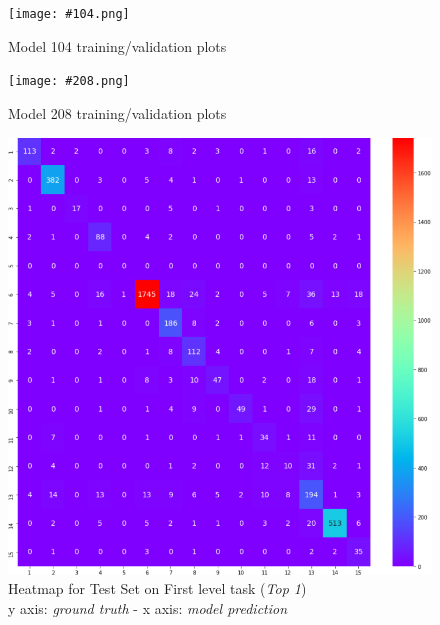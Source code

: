 \documentclass[12pt]{article}
\begin{document}
\pagebreak

\begin{figure}[ht!]
        \begin{adjustwidth}{-3.2cm}{}
    	    \begin{center}
        \texttt{[image: \#104.png]}
            \end{center}
	    \end{adjustwidth}
        \caption{Model 104 training/validation plots}
        \label{fig:model104}
\end{figure}

\begin{figure}[ht!]
        \begin{adjustwidth}{-3.2cm}{}
    	    \begin{center}
        \texttt{[image: \#208.png]}
            \end{center}
	    \end{adjustwidth}
        \caption{Model 208 training/validation plots}
        \label{fig:model200}
\end{figure}
\newpage
{}
\begin{figure}[ht!]
        \begin{adjustwidth}{-3.2cm}{}
    	    \begin{center}
        \includegraphics[width=1.45\textwidth]{heatmap1.png}
            \end{center}
	    \end{adjustwidth}
	    \captionsetup{justification   = centering}
        \caption{Heatmap for Test Set on First level task (\textit{Top 1}) \\y axis: \textit{ground truth} - x axis: \textit{model prediction}}
        \label{fig:heatfirst1}
\end{figure}
\end{document}
